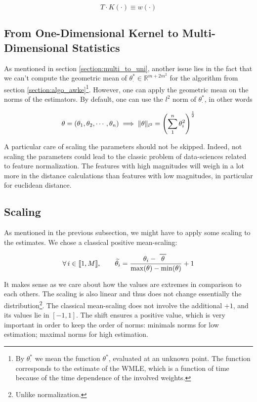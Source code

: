 \documentclass[11pt]{book}
\begin{document}
$$ T \cdot K ( \cdot ) \equiv w ( \cdot ) $$

\subsection{From One-Dimensional Kernel to Multi-Dimensional Statistics}
As mentioned in section \ref{section:multi_to_uni}, another issue lies in the fact that we can't compute the geometric mean of $\theta^*_{\cdot} \in \mathbb R^{m+2m^2}$ for the algorithm from section \ref{section:algo_awke}\footnote{By $\theta^*_{\cdot}$ we mean the function $\theta^*$, evaluated at an unknown point. The function corresponds to the estimate of the WMLE, which is a function of time because of the time dependence of the involved weights.}.
However, one can apply the geometric mean on the norms of the estimators. By default, one can use the $l^2$ norm of $\theta^*_{\cdot}$, in other words

$$\theta = (\theta_1, \theta_2, \cdots, \theta_n ) \implies 
\lVert \theta\rVert_{l^2} = \left ( \sum^n_1 \theta_i^2 \right )^{\frac 1 2}$$ 

\begin{remarque}
A particular care of scaling the parameters should not be skipped. Indeed, not scaling the parameters could lead to the classic problem of data-sciences related to feature normalization. The features with high magnitudes will weigh in a lot more in the distance calculations than features with low magnitudes, in particular for euclidean distance.
\end{remarque}

\subsection{Scaling}
\label{subsection:scaling}

As mentioned in the previous subsection, we might have to apply some scaling to the estimates. We chose a classical positive mean-scaling:

$$ \forall i \in  \llbracket 1, M \rrbracket, \qquad  \widetilde{\theta_i } = \frac{\theta_i - \mean \theta }{\max(\theta) - \min(\theta) } + 1 $$

It makes sense as we care about how the values are extremes in comparison to each others. The scaling is also linear and thus does not change essentially the distribution\footnote{Unlike normalization.}. The classical mean-scaling does not involve the additional $+1$, and its values lie in $[-1,1]$. The shift ensures a positive value, which is very important in order to keep the order of norms: minimals norms for low estimation; maximal norms for high estimation.
\end{document}
